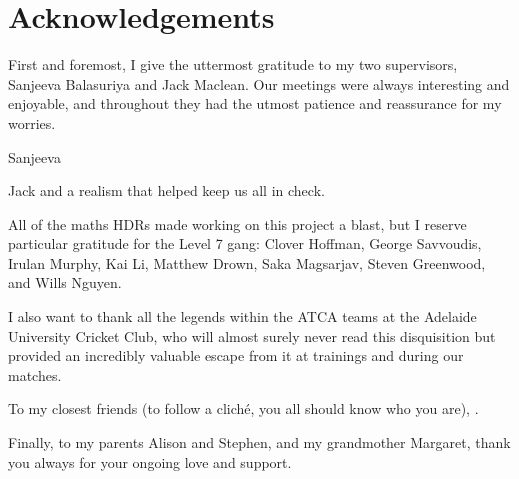 \chapter{Acknowledgements}
\label{ch:acknowledgements}

First and foremost, I give the uttermost gratitude to my two supervisors, Sanjeeva Balasuriya and Jack Maclean.
Our meetings were always interesting and enjoyable, and throughout they had the utmost patience and reassurance for my worries.

Sanjeeva

Jack and a realism that helped keep us all in check.

All of the maths HDRs made working on this project a blast, but I reserve particular gratitude for the Level 7 gang: Clover Hoffman, George Savvoudis, Irulan Murphy, Kai Li, Matthew Drown, Saka Magsarjav, Steven Greenwood, and Wills Nguyen.

I also want to thank all the legends within the ATCA teams at the Adelaide University Cricket Club, who will almost surely never read this disquisition but provided an incredibly valuable escape from it at trainings and during our matches.

To my closest friends (to follow a clich\'e, you all should know who you are), .

Finally, to my parents Alison and Stephen, and my grandmother Margaret, thank you always for your ongoing love and support.
